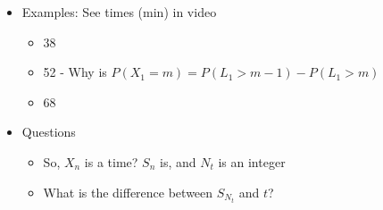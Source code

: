 \documentclass{report}
\begin{document}
\begin{itemize}
      \item Examples: See times (min) in video
        \begin{itemize}
          \item 38
          \item 52 - Why is $P(X_1=m) = P(L_1 > m-1) - P(L_1 >m)$
          \item 68
        \end{itemize}
      \item Questions
        \begin{itemize}
          \item So, $X_n$ is a time?  $S_n$ is, and $N_t$ is an integer
          \item What is the difference between $S_{N_t}$ and $t$?
        \end{itemize}
      

  \end{itemize}
\end{document}
